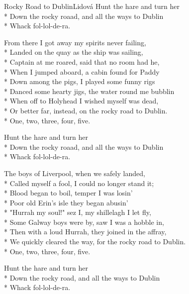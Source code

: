 \documentclass[10.5pt]{book}
\begin{document}
\begin{poem}{Rocky Road to Dublin}{Lidová}
Hunt the hare and turn her\\*
Down the rocky roaad, and all the ways to Dublin\\*
Whack fol-lol-de-ra.

From there I got away my spirits never failing,\\*
Landed on the quay as the ship was sailing,\\*
Captain at me roared, said that no room had he,\\*
When I jumped aboard, a cabin found for Paddy\\*
Down among the pigs, I played some funny rigs\\*
Danced some hearty jigs, the water round me \mbox{bubblin}\\*
When off to Holyhead I wished myself was dead,\\*
Or better far, instead, on the rocky road to Dublin.\\*
One, two, three, four, five. 

Hunt the hare and turn her\\*
Down the rocky roaad, and all the ways to Dublin\\*
Whack fol-lol-de-ra.

The boys of Liverpool, when we safely landed,\\*
Called myself a fool, I could no longer stand it;\\*
Blood began to boil, temper I was losin'\\*
Poor old Erin's isle they began abusin'\\*
"Hurrah my soul!" sez I, my shillelagh I let fly,\\*
Some Galway boys were by, saw I was a hobble in,\\*
Then with a loud Hurrah, they joined in the affray,\\*
We quickly cleared the way, for the rocky road to Dublin.\\*
One, two, three, four, five. 

Hunt the hare and turn her\\*
Down the rocky road, and all the ways to Dublin\\*
Whack fol-lol-de-ra.

\end{poem}
\end{document}
